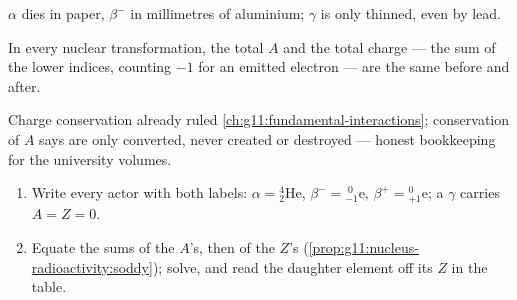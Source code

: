 \begin{omfigure}

{\small $\alpha$ dies in paper, $\beta^-$ in millimetres of aluminium;
$\gamma$ is only thinned, even by lead.}
\end{omfigure}

\begin{proposition}\label{prop:g11:nucleus-radioactivity:soddy}
In every nuclear transformation, the total  $A$ and the total
charge --- the sum of the lower indices, counting $-1$ for an emitted
electron --- are the same before and after.
\end{proposition}
\admitted

\begin{remark}
Charge conservation already ruled \cref{ch:g11:fundamental-interactions};
conservation of $A$ says  are only converted, never created or
destroyed --- honest bookkeeping for the university volumes.
\end{remark}

\begin{method}\label{met:g11:nucleus-radioactivity:balance}
\begin{enumerate}
  \item Write every actor with both labels: $\alpha = {}^{4}_{2}\mathrm{He}$,
        $\beta^- = {}^{\;0}_{-1}\mathrm{e}$, $\beta^+ = {}^{0}_{+1}\mathrm{e}$; a $\gamma$ carries $A = Z = 0$.
  \item Equate the sums of the $A$'s, then of the $Z$'s
        (\cref{prop:g11:nucleus-radioactivity:soddy}); solve, and read the
        daughter element off its $Z$ in the  table.
\end{enumerate}
\end{method}

